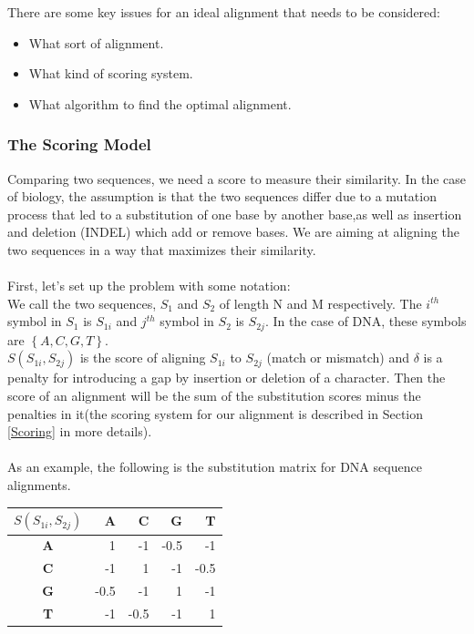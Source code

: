 \documentclass[11pt,a4paper]{report}
\begin{document}
There are some key issues for an ideal alignment that needs to be considered:

\begin{itemize} 
	\item  What sort of alignment.
	\item  What kind of scoring system.
	\item  What algorithm to find the optimal alignment.
\end{itemize}





\subsubsection{The Scoring Model} \label{The Scoring Model}

Comparing two sequences, we need a score to measure their similarity.
In the case of biology, the assumption is that the two sequences differ
due to a mutation process that led to a substitution 
of one base by another base,as well as insertion and deletion (INDEL) which add or remove bases.
We are aiming at aligning the two sequences in a way that maximizes their similarity.\\ \\
First, let's set up the problem with some notation:\\
We call the two sequences, $S_{1}$ and $S_{2}$ of length N and M respectively. 
The $i^{th}$ symbol in $S_{1}$ is $S_{1i}$ and $j^{th}$ symbol in $S_{2}$ is $S_{2j}$. 
In the case of DNA, these symbols are $\left\{A, C, G, T\right\}$.\\
$S(S_{1i}, S_{2j})$ is the score of aligning $S_{1i}$ to $S_{2j}$ (match or mismatch)
and $\delta$ is a penalty for introducing a gap by insertion or deletion of a character. 
Then the score of an alignment will be the sum of the substitution scores minus the 
penalties in it(the scoring system for our alignment is described in Section 
\ref{Scoring} in more details).\\\\
As an example, the following is the substitution matrix for DNA sequence alignments.


\begin{table}[H]
 \centering
  \begin{tabular}{  c| r  r r  r }
    
  \textbf{  $S(S_{1i}, S_{2j})$ } & \textbf{A} &\textbf{ C} &\textbf{ G} &\textbf{ T} \\ \hline
       \textbf{A} &  1  & -1 & -0.5 & -1 \\
       \textbf{C} & -1  & 1 & -1 & -0.5 \\ 
       \textbf{G} & -0.5 & -1 & 1 & -1 \\ 
       \textbf{T} & -1 & -0.5 & -1 & 1
    \end{tabular}
\label{alignment-exp}
\end{table}
\end{document}
